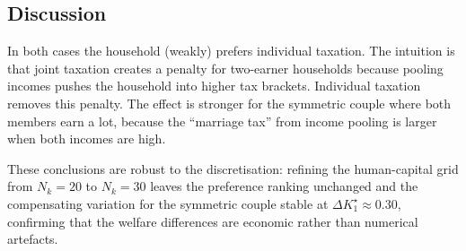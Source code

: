 \subsection*{Discussion}

In both cases the household (weakly) prefers individual taxation. The intuition is that joint taxation creates a penalty for two-earner households because pooling incomes pushes the household into higher tax brackets. Individual taxation removes this penalty. The effect is stronger for the symmetric couple where both members earn a lot, because the ``marriage tax'' from income pooling is larger when both incomes are high.

These conclusions are robust to the discretisation: refining the human-capital grid from $N_k = 20$ to $N_k = 30$ leaves the preference ranking unchanged and the compensating variation for the symmetric couple stable at $\Delta K_1^{\star} \approx 0.30$, confirming that the welfare differences are economic rather than numerical artefacts.
